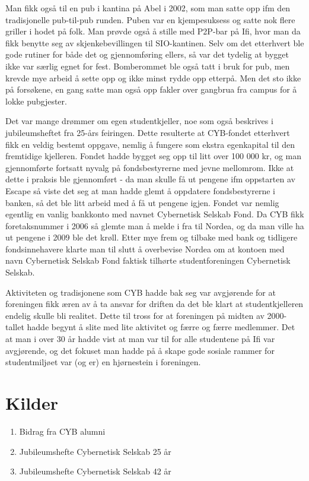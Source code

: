 Man fikk også til en pub i kantina på Abel i 2002, som man satte opp ifm den tradisjonelle pub-til-pub runden. Puben var en kjempesuksess og satte nok flere griller i hodet på folk. Man prøvde også å stille med P2P-bar på Ifi, hvor man da fikk benytte seg av skjenkebevillingen til SIO-kantinen. Selv om det etterhvert ble gode rutiner for både det og gjennomføring ellers, så var det tydelig at bygget ikke var særlig egnet for fest. Bomberommet ble også tatt i bruk for pub, men krevde mye arbeid å sette opp og ikke minst rydde opp etterpå. Men det sto ikke på forsøkene, en gang satte man også opp fakler over gangbrua fra campus for å lokke pubgjester.

Det var mange drømmer om egen studentkjeller, noe som også beskrives i jubileumsheftet fra 25-års feiringen. Dette resulterte at CYB-fondet etterhvert fikk en veldig bestemt oppgave, nemlig å fungere som ekstra egenkapital til den fremtidige kjelleren. Fondet hadde bygget seg opp til litt over 100 000 kr, og man gjennomførte fortsatt nyvalg på fondsbestyrerne med jevne mellomrom. Ikke at dette i praksis ble gjennomført - da man skulle få ut pengene ifm oppstarten av Escape så viste det seg at man hadde glemt å oppdatere fondsbestyrerne i banken, så det ble litt arbeid med å få ut pengene igjen. Fondet var nemlig egentlig en vanlig bankkonto med navnet Cybernetisk Selskab Fond. Da CYB fikk foretaksnummer i 2006 så glemte man å melde i fra til Nordea, og da man ville ha ut pengene i 2009 ble det krøll. Etter mye frem og tilbake med bank og tidligere fondsinnehavere klarte man til slutt å overbevise Nordea om at kontoen med navn Cybernetisk Selskab Fond faktisk tilhørte studentforeningen Cybernetisk Selskab.

Aktiviteten og tradisjonene som CYB hadde bak seg var avgjørende for at foreningen fikk æren av å ta ansvar for driften da det ble klart at studentkjelleren endelig skulle bli realitet. Dette til tross for at foreningen på midten av 2000-tallet hadde begynt å slite med lite aktivitet og færre og færre medlemmer. Det at man i over 30 år hadde vist at man var til for alle studentene på Ifi var avgjørende, og det fokuset man hadde på å skape gode sosiale rammer for studentmiljøet var (og er) en hjørnestein i foreningen.

\section*{Kilder}

\begin{enumerate}
	\item Bidrag fra CYB alumni
	\item Jubileumshefte Cybernetisk Selskab 25 år
	\item Jubileumshefte Cybernetisk Selskab 42 år
\end{enumerate}
